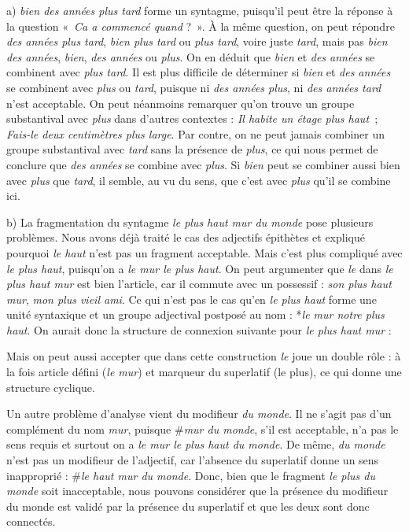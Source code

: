 { a) \textit{bien des années plus tard} forme un syntagme, puisqu’il peut être la réponse à la question «~\textit{Ca a commencé quand} ?~». À la même question, on peut répondre \textit{des années plus tard}, \textit{bien plus tard} ou \textit{plus tard}, voire juste \textit{tard}, mais pas \textit{bien des années}, \textit{bien}, \textit{des années} ou \textit{plus}. On en déduit que \textit{bien} et \textit{des années} se combinent avec \textit{plus tard}. Il est plus difficile de déterminer si \textit{bien} et \textit{des années} se combinent avec \textit{plus} ou \textit{tard}, puisque ni \textit{des années plus}, ni \textit{des années tard} n’est acceptable. On peut néanmoins remarquer qu’on trouve un groupe substantival avec \textit{plus} dans d’autres contextes : \textit{Il habite un étage plus haut~}; \textit{Fais-le deux centimètres plus large}. Par contre, on ne peut jamais combiner un groupe substantival avec \textit{tard} sans la présence de \textit{plus}, ce qui nous permet de conclure que \textit{des années} se combine avec \textit{plus}. Si \textit{bien} peut se combiner aussi bien avec \textit{plus} que \textit{tard}, il semble, au vu du sens, que c’est avec \textit{plus} qu’il se combine ici.



b) La fragmentation du syntagme \textit{le plus haut mur du monde} pose plusieurs problèmes. Nous avons déjà traité le cas des adjectifs épithètes et expliqué pourquoi \textit{le haut} n’est pas un fragment acceptable. Mais c’est plus compliqué avec \textit{le plus haut}, puisqu’on a \textit{le mur le plus haut}. On peut argumenter que \textit{le} dans \textit{le plus haut mur} est bien l’article, car il commute avec un possessif : \textit{son plus haut mur}, \textit{mon plus vieil ami}. Ce qui n’est pas le cas qu’en \textit{le plus haut} forme une unité syntaxique et un groupe adjectival postposé au nom : *\textit{le mur notre plus haut}. On aurait donc la structure de connexion suivante pour \textit{le plus haut mur} :

Mais on peut aussi accepter que dans cette construction \textit{le} joue un double rôle : à la fois article défini (\textit{le mur}) et marqueur du superlatif (le plus), ce qui donne une structure cyclique.



Un autre problème d’analyse vient du modifieur \textit{du monde}. Il ne s’agit pas d’un complément du nom \textit{mur}, puisque \#\textit{mur du monde}, s’il est acceptable, n’a pas le sens requis et surtout on a \textit{le mur le plus haut du monde}. De même, \textit{du monde} n’est pas un modifieur de l’adjectif, car l’absence du superlatif donne un sens inapproprié : \#\textit{le haut mur du monde}. Donc, bien que le fragment \textit{le plus du monde} soit inacceptable, nous pouvons considérer que la présence du modifieur du monde est validé par la présence du superlatif et que les deux sont donc connectés.

}
